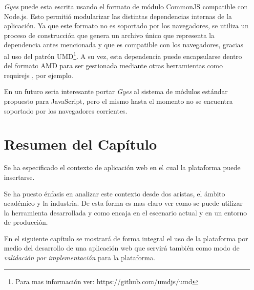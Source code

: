 \emph{Gyes} puede esta escrita usando el formato de módulo CommonJS \citep{ind:commonjsmodules} compatible con Node.js. Esto permitió modularizar las distintas dependencias internas de la aplicación. Ya que este formato no es soportado por los navegadores, se utiliza un proceso de construcción que genera un archivo único que representa la dependencia antes mencionada y que es compatible con los navegadores, gracias al uso del patrón UMD\footnote{Para mas información ver: https://github.com/umdjs/umd}. A su vez, esta dependencia puede encapsularse dentro del formato AMD para ser gestionada mediante otras herramientas como requirejs \citep{ind:requirejsmodules}, por ejemplo. 

En un futuro seria interesante portar \emph{Gyes} al sistema de módulos estándar propuesto para JavaScript, pero el mismo hasta el momento no se encuentra soportado por los navegadores corrientes.

\section{Resumen del Capítulo} \label{sec:extension_conclusion}

Se ha especificado el contexto de aplicación web en el cual la plataforma puede insertarse. 

Se ha puesto énfasis en analizar este contexto desde dos aristas, el ámbito académico y la industria. De esta forma es mas claro ver como se puede utilizar la herramienta desarrollada y como encaja en el escenario actual y en un entorno de producción.

En el siguiente capítulo se mostrará de forma integral el uso de la plataforma por medio del desarrollo de una aplicación web que servirá también como modo de \emph{validación por implementación} para la plataforma.